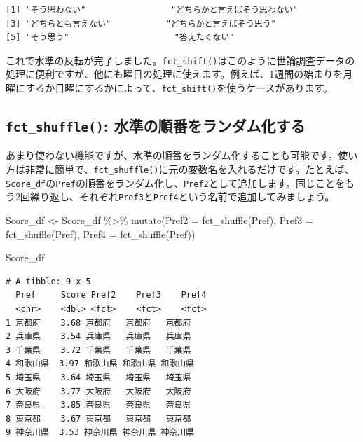 \documentclass[
  a4paper,
  pandoc,
  ja=standard,
  jafont=haranoaji]{bxjsbook}
\newenvironment{Shaded}{\begin{snugshade}}{\end{snugshade}}
\newcommand{\AttributeTok}[1]{\textcolor[rgb]{0.00,0.48,0.65}{#1}}
\newcommand{\FunctionTok}[1]{\textcolor[rgb]{0.28,0.35,0.67}{#1}}
\newcommand{\NormalTok}[1]{\textcolor[rgb]{0.00,0.48,0.65}{#1}}
\newcommand{\OtherTok}[1]{\textcolor[rgb]{0.00,0.48,0.65}{#1}}
\newcommand{\SpecialCharTok}[1]{\textcolor[rgb]{0.37,0.37,0.37}{#1}}
\begin{document}
\begin{verbatim}
[1] "そう思わない"                 "どちらかと言えばそう思わない"
[3] "どちらとも言えない"           "どちらかと言えばそう思う"    
[5] "そう思う"                     "答えたくない"                
\end{verbatim}

これで水準の反転が完了しました。\texttt{fct\_shift()}はこのように世論調査データの処理に便利ですが、他にも曜日の処理に使えます。例えば、1週間の始まりを月曜にするか日曜にするかによって、\texttt{fct\_shift()}を使うケースがあります。

\hypertarget{fct_shuffle-ux6c34ux6e96ux306eux9806ux756aux3092ux30e9ux30f3ux30c0ux30e0ux5316ux3059ux308b}{%
\subsection{\texorpdfstring{\texttt{fct\_shuffle()}:
水準の順番をランダム化する}{fct\_shuffle(): 水準の順番をランダム化する}}\label{fct_shuffle-ux6c34ux6e96ux306eux9806ux756aux3092ux30e9ux30f3ux30c0ux30e0ux5316ux3059ux308b}}

あまり使わない機能ですが、水準の順番をランダム化することも可能です。使い方は非常に簡単で、\texttt{fct\_shuffle()}に元の変数名を入れるだけです。たとえば、\texttt{Score\_df}の\texttt{Pref}の順番をランダム化し、\texttt{Pref2}として追加します。同じことをもう2回繰り返し、それぞれ\texttt{Pref3}と\texttt{Pref4}という名前で追加してみましょう。

\begin{Shaded}
\begin{Highlighting}[numbers=left,,]
\NormalTok{Score\_df }\OtherTok{\textless{}{-}}\NormalTok{ Score\_df }\SpecialCharTok{\%\textgreater{}\%}
  \FunctionTok{mutate}\NormalTok{(}\AttributeTok{Pref2 =} \FunctionTok{fct\_shuffle}\NormalTok{(Pref),}
         \AttributeTok{Pref3 =} \FunctionTok{fct\_shuffle}\NormalTok{(Pref),}
         \AttributeTok{Pref4 =} \FunctionTok{fct\_shuffle}\NormalTok{(Pref))}

\NormalTok{Score\_df}
\end{Highlighting}
\end{Shaded}

\begin{verbatim}
# A tibble: 9 x 5
  Pref     Score Pref2    Pref3    Pref4   
  <chr>    <dbl> <fct>    <fct>    <fct>   
1 京都府    3.68 京都府   京都府   京都府  
2 兵庫県    3.54 兵庫県   兵庫県   兵庫県  
3 千葉県    3.72 千葉県   千葉県   千葉県  
4 和歌山県  3.97 和歌山県 和歌山県 和歌山県
5 埼玉県    3.64 埼玉県   埼玉県   埼玉県  
6 大阪府    3.77 大阪府   大阪府   大阪府  
7 奈良県    3.85 奈良県   奈良県   奈良県  
8 東京都    3.67 東京都   東京都   東京都  
9 神奈川県  3.53 神奈川県 神奈川県 神奈川県
\end{verbatim}
\end{document}
